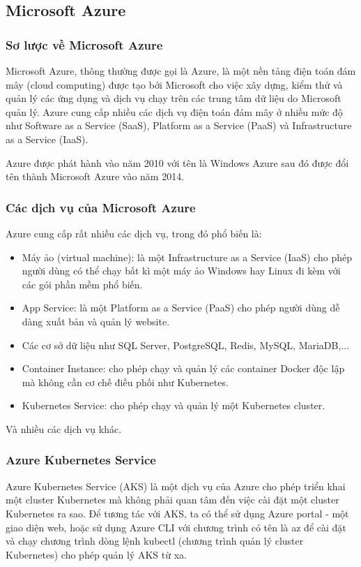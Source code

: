 \subsection{Microsoft Azure}
\subsubsection{Sơ lược về Microsoft Azure}
Microsoft Azure, thông thường được gọi là Azure, là một nền
tảng điện toán đám mây (cloud computing) được tạo bởi Microsoft
cho việc xây dựng, kiểm thử và quản lý các ứng dụng và dịch vụ
chạy trên các trung tâm dữ liệu do Microsoft quản lý. Azure
cung cấp nhiều các dịch vụ điện toán đám mây ở nhiều mức độ như
Software as a Service (SaaS), Platform as a Service (PaaS)
và Infrastructure as a Service (IaaS). 

Azure được phát hành vào năm 2010 với tên là Windows Azure sau
đó được đổi tên thành Microsoft Azure vào năm 2014. 

\subsubsection{Các dịch vụ của Microsoft Azure}
Azure cung cấp rất nhiều các dịch vụ, trong đó phổ biến là:
\begin{itemize}[topsep=0ex]
\item Máy ảo (virtual machine): là một Infrastructure as a Service
(IaaS) cho phép người dùng có thể chạy bất kì một máy ảo Windows
hay Linux đi kèm với các gói phần mềm phổ biến.

\item App Service: là một Platform as a Service (PaaS) cho phép
người dùng dễ dàng xuất bản và quản lý website.

\item Các cơ sở dữ liệu như SQL Server, PostgreSQL, Redis,
MySQL, MariaDB,...

\item Container Instance: cho phép chạy và quản lý các container
Docker độc lập mà không cần cơ chế điều phối như Kubernetes.

\item Kubernetes Service: cho phép chạy và quản lý một
Kubernetes cluster.
\end{itemize}
Và nhiều các dịch vụ khác.

\subsubsection{Azure Kubernetes Service}
Azure Kubernetes Service (AKS) là một dịch vụ của Azure cho phép triển
khai một cluster Kubernetes mà không phải quan tâm đến việc cài đặt một
cluster Kubernetes ra sao. Để tương tác với AKS, ta có thể sử dụng
Azure portal - một giao diện web, hoặc sử dụng Azure CLI với
chương trình có tên là az để cài đặt và chạy chương trình dòng
lệnh kubectl (chương trình quản lý cluster Kubernetes) cho phép
quản lý AKS từ xa. 
